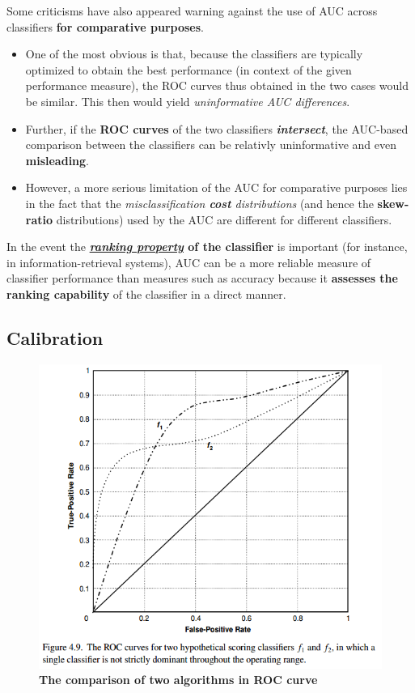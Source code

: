 \documentclass[11pt]{article}
\begin{document}
Some criticisms have also appeared warning against the use of AUC across classifiers \textbf{for comparative purposes}. 
\begin{itemize}
\item One of the most obvious is that, because the classifiers
are typically optimized to obtain the best performance (in context of the given performance measure), the ROC curves thus obtained in the two cases would be similar. This then would yield \emph{uninformative AUC differences}.
\item Further, if the \textbf{ROC curves} of the two classifiers \textbf{\emph{intersect}}, the AUC-based comparison between the classifiers can be relativly uninformative and even \textbf{misleading}. 
\item  However, a more serious limitation of the AUC for
comparative purposes lies in the fact that the \emph{misclassification \textbf{cost} distributions} (and hence the \textbf{skew-ratio} distributions) used by the AUC are different for different classifiers. 
\end{itemize}

In the event the \textbf{\underline{\emph{ranking property}} of the classifier} is important (for instance, in information-retrieval systems), AUC can be a more reliable measure
of classifier performance than measures such as accuracy because it \textbf{assesses the ranking capability} of the classifier in a direct manner. 


\subsection{Calibration}
\begin{figure}
\begin{minipage}[t]{1\linewidth}
  \centering
  \centerline{\includegraphics[scale = 0.5]{roc_two_classifiers.png}}
\end{minipage}
\caption{\footnotesize{\textbf{The comparison of two algorithms in ROC curve \citep{japkowicz2011evaluating}}}}
\label{fig: roc_two_classifiers}
\end{figure}
\end{document}
